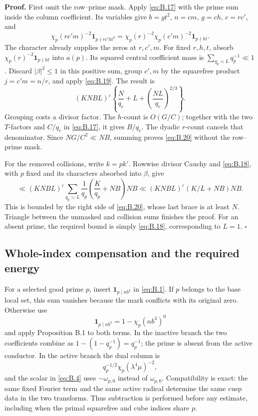 \documentclass[11pt,a4paper]{article}
\begin{document}
\textbf{Proof.} First omit the row--prime mask. Apply \eqref{eq:B.17} with the prime sum inside the column coefficient. Its variables give \(b=gt^2\), \(n=cm\), \(g=ch\), \(c=rc'\), and \[
 \chi_p(rc'm)^{-2}\mathbf1_{p\nmid rc'ht^2}
 =\chi_p(r)^{-2}\chi_p(c'm)^{-2}\mathbf1_{p\nmid ht}.
\] The character already supplies the zeros at \(r,c',m\). For fixed \(r,h,t\), absorb \(\chi_p(r)^{-2}\mathbf1_{p\nmid ht}\) into \(a(p)\). Its squared central coefficient mass is \(\sum_{q_p\asymp L}q_p^{-1}\ll1\). Discard \(|\beta|^2\le1\) in this positive sum, group \(c',m\) by the squarefree product \(j=c'm=n/r\), and apply \eqref{eq:B.19}. The result is \[
 (KNBL)^\varepsilon\left\{\frac N{q_r}+L+
                 \left(\frac{NL}{q_r}\right)^{2/3}\right\}.
\] Grouping costs a divisor factor. The \(h\)-count is \(O(G/C)\); together with the two \(T\)-factors and \(C/q_r\) in \eqref{eq:B.17}, it gives \(B/q_r\). The dyadic \(r\)-count cancels that denominator. Since \(NG/C^2\ll NB\), summing proves \eqref{eq:B.20} without the row--prime mask.

For the removed collisions, write \(k=pk'\). Rowwise divisor Cauchy and \eqref{eq:B.18}, with \(p\) fixed and its characters absorbed into \(\beta\), give \[
 \ll(KNBL)^\varepsilon\sum_{q_p\asymp L}\frac1{q_p}
       \left(\frac K{q_p}+NB\right)NB
 \ll(KNBL)^\varepsilon(K/L+NB)NB.
\] This is bounded by the right side of \eqref{eq:B.20}, whose last brace is at least \(N\). Triangle between the unmasked and collision sums finishes the proof. For an absent prime, the required bound is simply \eqref{eq:B.18}, corresponding to \(L=1\). \hfill\(\square\)

\subsection{Whole-index compensation and the required energy}\label{sec:B.4}

For a selected good prime \(p\), insert \(\mathbf1_{p\mid nb^3}\) in \eqref{eq:B.1}. If \(p\) belongs to the base local set, this sum vanishes because the mark conflicts with its original zero. Otherwise use \[
\mathbf1_{p\mid nb^3}=1-\chi_p(nb^3)^0
\] and apply Proposition B.1 to both terms. In the inactive branch the two coefficients combine as \(1-(1-q_p^{-1})=q_p^{-1}\); the prime is absent from the active conductor. In the active branch the dual column is \[
q_p^{-1/2}\chi_p(\lambda^4\mu)^{-2},
\tag{B.21}\label{eq:B.21}
\] and the scalar in \eqref{eq:B.4} uses \(-\omega_{p,0}\) instead of \(\omega_{p,0}\). Compatibility is exact: the same fixed Fourier term and the same active radical determine the same cusp data in the two transforms. Thus subtraction is performed before any estimate, including when the primal squarefree and cube indices share \(p\).
\end{document}
